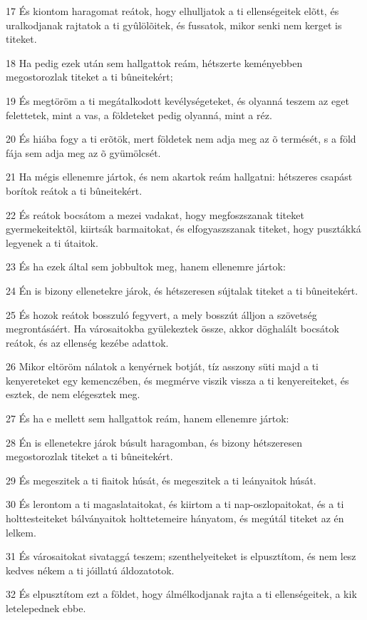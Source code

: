 \par 17 És kiontom haragomat reátok, hogy elhulljatok a ti ellenségeitek elõtt, és uralkodjanak rajtatok a ti gyûlölõitek, és fussatok, mikor senki nem kerget is titeket.
\par 18 Ha pedig ezek után sem hallgattok reám, hétszerte keményebben megostorozlak titeket a ti bûneitekért;
\par 19 És megtöröm a ti megátalkodott kevélységeteket, és olyanná teszem az eget felettetek, mint a vas, a földeteket pedig olyanná, mint a réz.
\par 20 És hiába fogy a ti erõtök, mert földetek nem adja meg az õ termését, s a föld fája sem adja meg az õ gyümölcsét.
\par 21 Ha mégis ellenemre jártok, és nem akartok reám hallgatni: hétszeres csapást borítok reátok a ti bûneitekért.
\par 22 És reátok bocsátom a mezei vadakat, hogy megfoszszanak titeket gyermekeitektõl, kiirtsák barmaitokat, és elfogyaszszanak titeket, hogy pusztákká legyenek a ti útaitok.
\par 23 És ha ezek által sem jobbultok meg, hanem ellenemre jártok:
\par 24 Én is bizony ellenetekre járok, és hétszeresen sújtalak titeket a ti bûneitekért.
\par 25 És hozok reátok bosszuló fegyvert, a mely bosszút álljon a szövetség megrontásáért. Ha városaitokba gyülekeztek össze, akkor döghalált bocsátok reátok, és az ellenség kezébe adattok.
\par 26 Mikor eltöröm nálatok a kenyérnek botját, tíz asszony süti majd a ti kenyereteket egy kemenczében, és megmérve viszik vissza a ti kenyereiteket, és esztek, de  nem elégesztek meg.
\par 27 És ha e mellett sem hallgattok reám, hanem ellenemre jártok:
\par 28 Én is ellenetekre járok búsult haragomban, és bizony hétszeresen megostorozlak titeket a ti bûneitekért.
\par 29 És megeszitek a ti fiaitok húsát, és megeszitek a ti leányaitok húsát.
\par 30 És lerontom a ti magaslataitokat, és kiirtom a ti nap-oszlopaitokat, és a ti holttesteiteket bálványaitok holttetemeire hányatom, és megútál titeket az én lelkem.
\par 31 És városaitokat sivataggá teszem; szenthelyeiteket is elpusztítom, és nem lesz kedves nékem a ti jóillatú áldozatotok.
\par 32 És elpusztítom ezt a földet, hogy álmélkodjanak rajta a ti ellenségeitek, a kik letelepednek ebbe.
